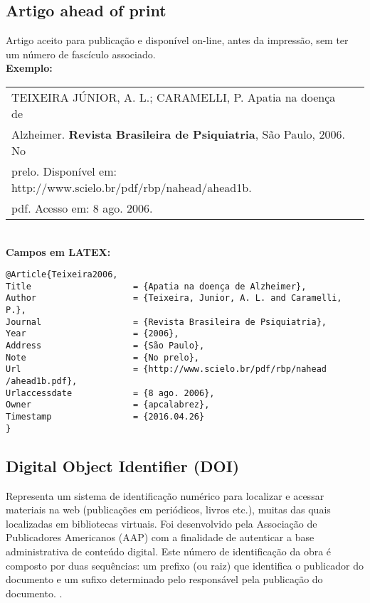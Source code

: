 \subsection{Artigo ahead of print}

Artigo aceito para publicação e disponível on-line, antes da impressão,
sem ter um número de fascículo associado. \\

\textbf{Exemplo:} \\


\begin{tabular}{|l|c|} \hline
	TEIXEIRA JÚNIOR, A. L.; CARAMELLI, P. Apatia na doença de \\Alzheimer. \textbf{Revista Brasileira de Psiquiatria}, São Paulo, 2006. No\\ prelo. Disponível em:
	http://www.scielo.br/pdf/rbp/nahead/ahead1b.\\pdf. Acesso em: 8 ago.
	2006. 
	\\\hline
\end{tabular} \\

\textbf{Campos em LATEX:} 

\begin{verbatim}
@Article{Teixeira2006,
Title                    = {Apatia na doença de Alzheimer},
Author                   = {Teixeira, Junior, A. L. and Caramelli, 
P.},
Journal                  = {Revista Brasileira de Psiquiatria},
Year                     = {2006},
Address                  = {São Paulo},
Note                     = {No prelo},
Url                      = {http://www.scielo.br/pdf/rbp/nahead
/ahead1b.pdf},
Urlaccessdate            = {8 ago. 2006},
Owner                    = {apcalabrez},
Timestamp                = {2016.04.26}
}
\end{verbatim}

\subsection{Digital Object Identifier (DOI)}

Representa um sistema de identificação numérico para localizar e
acessar materiais na web (publicações em periódicos, livros etc.), muitas
das quais localizadas em bibliotecas virtuais. Foi desenvolvido pela
Associação de Publicadores Americanos (AAP) com a finalidade de autenticar a base administrativa de conteúdo digital. Este número de
identificação da obra é composto por duas sequências: um prefixo (ou
raiz) que identifica o publicador do documento e um sufixo determinado
pelo responsável pela publicação do documento. \cite{Doic2016}.

